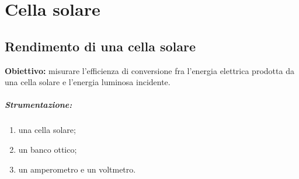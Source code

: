 \chapter{Cella solare}

\renewcommand\thesection{\Roman{section}}

\section{Rendimento di una cella solare}

\textbf{Obiettivo:} misurare l'efficienza di conversione fra l'energia elettrica prodotta da una cella solare e l'energia luminosa incidente.

\paragraph{Strumentazione:} 
\begin{enumerate}
    \item una cella solare;
    \item un banco ottico;
    \item un amperometro e un voltmetro. 
\end{enumerate}

